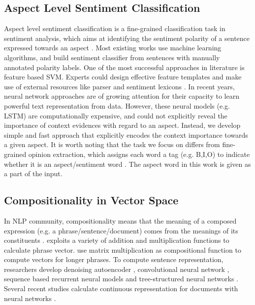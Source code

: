 \documentclass[11pt,letterpaper]{article}
\begin{document}
\subsection{Aspect Level Sentiment Classification}
Aspect level sentiment classification is a fine-grained classification task in sentiment analysis, which
aims at identifying the sentiment polarity of a sentence expressed towards an aspect \cite{Pontiki2014}. 
Most existing works use machine learning algorithms, and build sentiment classifier from sentences with manually annotated polarity labels.
One of the most successful approaches in literature is feature based SVM. Experts could design effective feature templates and make use of external resources like parser and sentiment lexicons \cite{Kiritchenko2014-SemEval,Wagner2014-SemEval}.
In recent years, neural network approaches \cite{Dong2014,Lakkaraju2014aspect,Nguyen2015:EMNLP,Tang2015arxiv} are of growing attention for their capacity to learn powerful text representation from data. 
However, these neural models (e.g. LSTM) are computationally expensive, and could not explicitly reveal the importance of context evidences with regard to an aspect. 
Instead, we develop simple and fast approach that explicitly encodes the context importance towards a given aspect.
It is worth noting that the task we focus on differs from fine-grained opinion extraction, which assigns each word a tag (e.g. B,I,O) to indicate whether it is an aspect/sentiment word \cite{Choi2010,Irsoy2014,Liu2015}. The aspect word in this work is given as a part of the input.


\subsection{Compositionality in Vector Space}
In NLP community, compositionality means that the meaning of a composed expression (e.g. a phrase/sentence/document) comes from the meanings of its constituents \cite{Frege1892}.
 exploits a variety of addition and multiplication functions to calculate phrase vector. 
 use matrix multiplication as compositional function to compute vectors for longer phrases.
To compute sentence representation, researchers develop denoising autoencoder \cite{Glorot2011}, convolutional neural network \cite{Kalchbrenner2014,Kim2014,Yin-schutze:2015:CoNLL}, sequence based recurrent neural models \cite{Sutskever2014sequence,Kiros2015skip,Li2015a} and tree-structured neural networks \cite{Socher2013a,Tai2015,Zhu2015}.
Several recent studies calculate continuous representation for documents with neural networks \cite{Le2014,Bhatia2015,Li2015,Tang2015,Yang2016hierarchical}.
\end{document}
